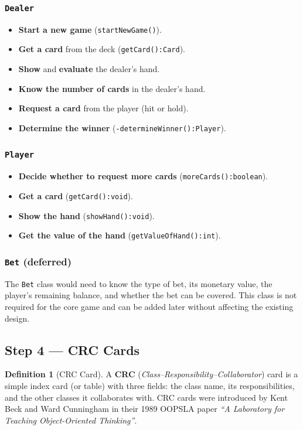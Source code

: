\documentclass[11pt, a4paper, notitlepage]{report}
\theoremstyle{definition}
\newtheorem{definition}[theorem]{Definition}
\theoremstyle{remark}
\theoremstyle{definition}
\begin{document}
\subsubsection{\texttt{Dealer}}
\begin{itemize}
  \item \textbf{Start a new game} (\texttt{startNewGame()}).
  \item \textbf{Get a card} from the deck (\texttt{getCard():Card}).
  \item \textbf{Show} and \textbf{evaluate} the dealer's hand.
  \item \textbf{Know the number of cards} in the dealer's hand.
  \item \textbf{Request a card} from the player (hit or hold).
  \item \textbf{Determine the winner} (\texttt{-determineWinner():Player}).
\end{itemize}

\subsubsection{\texttt{Player}}
\begin{itemize}
  \item \textbf{Decide whether to request more cards} (\texttt{moreCards():boolean}).
  \item \textbf{Get a card} (\texttt{getCard():void}).
  \item \textbf{Show the hand} (\texttt{showHand():void}).
  \item \textbf{Get the value of the hand} (\texttt{getValueOfHand():int}).
\end{itemize}

\subsubsection{\texttt{Bet} (deferred)}
The \texttt{Bet} class would need to know the type of bet, its monetary value, the
player's remaining balance, and whether the bet can be covered. This class is not
required for the core game and can be added later without affecting the existing design.

\subsection{Step 4 --- CRC Cards}
\label{subsec:ch8-crc}

\begin{definition}[CRC Card]
\label{def:ch8-crc}
A \textbf{CRC} (\emph{Class--Responsibility--Collaborator}) card is a simple index card
(or table) with three fields: the class name, its responsibilities, and the other classes
it collaborates with. CRC cards were introduced by Kent Beck and Ward Cunningham in their
1989 OOPSLA paper \emph{``A Laboratory for Teaching Object-Oriented Thinking''}.
\end{definition}
\end{document}
